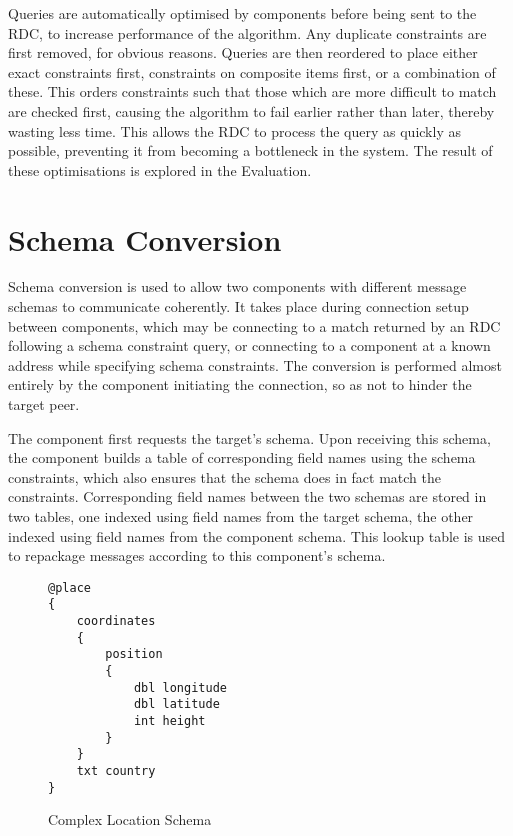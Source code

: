 \documentclass[12pt,twoside,notitlepage]{report}
\begin{document}
Queries are automatically optimised by components before being sent to the RDC, to increase performance of the algorithm. 
Any duplicate constraints are first removed, for obvious reasons. 
Queries are then reordered to place either exact constraints first, constraints on composite items first, or a combination of these. 
This orders constraints such that those which are more difficult to match are checked first, causing the algorithm to fail earlier rather than later, thereby wasting less time. 
This allows the RDC to process the query as quickly as possible, preventing it from becoming a bottleneck in the system. 
The result of these optimisations is explored in the Evaluation. 


\section{Schema Conversion}

Schema conversion is used to allow two components with different message schemas to communicate coherently. 
It takes place during connection setup between components, which may be connecting to a match returned by an RDC following a schema constraint query, or connecting to a component at a known address while specifying schema constraints. 
The conversion is performed almost entirely by the component initiating the connection, so as not to hinder the target peer. 

The component first requests the target's schema. 
Upon receiving this schema, the component builds a table of corresponding field names using the schema constraints, which also ensures that the schema does in fact match the constraints. 
Corresponding field names between the two schemas are stored in two tables, one indexed using field names from the target schema, the other indexed using field names from the component schema. 
This lookup table is used to repackage messages according to this component's schema. 

\begin{figure}
\begin{lstlisting}
@place
{
	coordinates
	{
		position
		{
			dbl longitude
			dbl latitude
			int height
		}
	}
	txt country
}
\end{lstlisting}
\caption{Complex Location Schema}
\label{fig:complexlocationschema}
\end{figure}
\end{document}
